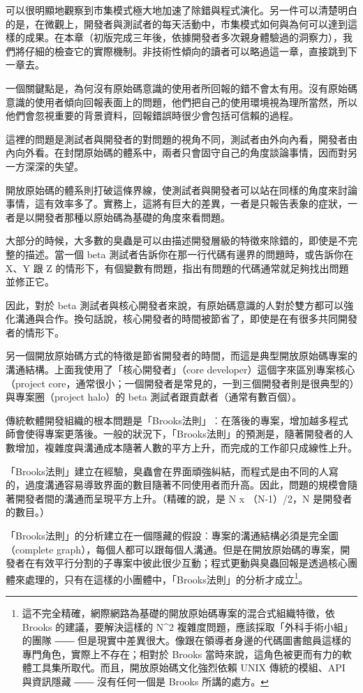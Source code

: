 \documentclass[12pt, a5paper]{book}
\begin{document}
可以很明顯地觀察到市集模式極大地加速了除錯與程式演化。另一件可以清楚明白的是，在微觀上，開發者與測試者的每天活動中，市集模式如何與為何可以達到這樣的成果。在本章（初版完成三年後，依據開發者多次親身體驗過的洞察力），我們將仔細的檢查它的實際機制。非技術性傾向的讀者可以略過這一章，直接跳到下一章去。

一個關鍵點是，為何沒有原始碼意識的使用者所回報的錯不會太有用。沒有原始碼意識的使用者傾向回報表面上的問題，他們把自己的使用環境視為理所當然，所以他們會忽視重要的背景資料，回報錯誤時很少會包括可信賴的過程。

這裡的問題是測試者與開發者的對問題的視角不同，測試者由外向內看，開發者由內向外看。在封閉原始碼的體系中，兩者只會固守自己的角度談論事情，因而對另一方深深的失望。

開放原始碼的體系則打破這條界線，使測試者與開發者可以站在同樣的角度來討論事情，這有效率多了。實務上，這將有巨大的差異，一者是只報告表象的症狀，一者是以開發者那種以原始碼為基礎的角度來看問題。

大部分的時候，大多數的臭蟲是可以由描述開發層級的特徵來除錯的，即使是不完整的描述。當一個
beta 測試者告訴你在那一行代碼有邊界的問題時，或告訴你在 X、Y 跟 Z
的情形下，有個變數有問題，指出有問題的代碼通常就足夠找出問題並修正它。

因此，對於 beta
測試者與核心開發者來說，有原始碼意識的人對於雙方都可以強化溝通與合作。換句話說，核心開發者的時間被節省了，即使是在有很多共同開發者的情形下。

另一個開放原始碼方式的特徵是節省開發者的時間，而這是典型開放原始碼專案的溝通結構。上面我使用了「核心開發者」（core
developer）這個字來區別專案核心（project
core，通常很小；一個開發者是常見的，一到三個開發者則是很典型的）與專案圈（project
halo）的 beta 測試者跟貢獻者（通常有數百個）。

傳統軟體開發組織的根本問題是「Brooks法則」︰在落後的專案，增加越多程式師會使得專案更落後。一般的狀況下，「Brooks法則」的預測是，隨著開發者的人數增加，複雜度與溝通成本隨著人數的平方上升，而完成的工作卻只成線性上升。

「Brooks法則」建立在經驗，臭蟲會在界面頑強糾結，而程式是由不同的人寫的，過度溝通容易導致界面的數目隨著不同使用者而升高。因此，問題的規模會隨著開發者間的溝通而呈現平方上升。（精確的說，是
N x （N-1）/2，N 是開發者的數目。）

「Brooks法則」的分析建立在一個隱藏的假設︰專案的溝通結構必須是完全圖（complete
graph），每個人都可以跟每個人溝通。但是在開放原始碼的專案，開發者在有效平行分割的子專案中彼此很少互動；程式更動與臭蟲回報是透過核心團體來處理的，只有在這樣的小團體中，「Brooks法則」的分析才成立\footnote{這不完全精確，網際網路為基礎的開放原始碼專案的混合式組織特徵，依
  Brooks 的建議，要解決這樣的 N\^{}2
  複雜度問題，應該採取「外科手術小組」的團隊 ――
  但是現實中差異很大。像跟在領導者身邊的代碼圖書館員這樣的專門角色，實際上不存在；相對於
  Brooks
  當時來說，這角色被更而有力的軟體工具集所取代。而且，開放原始碼文化強烈依賴
  UNIX 傳統的模組、API 與資訊隱藏 ―― 沒有任何一個是 Brooks 所講的處方。}。
\end{document}
